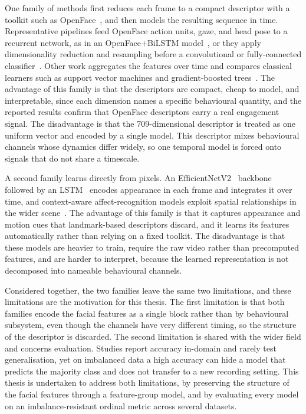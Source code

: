 \documentclass[../main.tex]{subfiles}
\begin{document}
One family of methods first reduces each frame to a compact descriptor with a toolkit such as OpenFace~\cite{openface2}, and then models the resulting sequence in time. Representative pipelines feed OpenFace action units, gaze, and head pose to a recurrent network, as in an OpenFace$+$BiLSTM model~\cite{openface_bilstm}, or they apply dimensionality reduction and resampling before a convolutional or fully-connected classifier~\cite{openface_pca_smote}. Other work aggregates the features over time and compares classical learners such as support vector machines and gradient-boosted trees~\cite{classical_ml_engagement}. The advantage of this family is that the descriptors are compact, cheap to model, and interpretable, since each dimension names a specific behavioural quantity, and the reported results confirm that OpenFace descriptors carry a real engagement signal. The disadvantage is that the 709-dimensional descriptor is treated as one uniform vector and encoded by a single model. This descriptor mixes behavioural channels whose dynamics differ widely, so one temporal model is forced onto signals that do not share a timescale.

A second family learns directly from pixels. An EfficientNetV2~\cite{efficientnetv2} backbone followed by an LSTM~\cite{efficientnet_lstm_engagement} encodes appearance in each frame and integrates it over time, and context-aware affect-recognition models exploit spatial relationships in the wider scene~\cite{context_aware_emotion_3d}. The advantage of this family is that it captures appearance and motion cues that landmark-based descriptors discard, and it learns its features automatically rather than relying on a fixed toolkit. The disadvantage is that these models are heavier to train, require the raw video rather than precomputed features, and are harder to interpret, because the learned representation is not decomposed into nameable behavioural channels.

Considered together, the two families leave the same two limitations, and these limitations are the motivation for this thesis. The first limitation is that both families encode the facial features as a single block rather than by behavioural subsystem, even though the channels have very different timing, so the structure of the descriptor is discarded. The second limitation is shared with the wider field and concerns evaluation. Studies report accuracy in-domain and rarely test generalisation, yet on imbalanced data a high accuracy can hide a model that predicts the majority class and does not transfer to a new recording setting. This thesis is undertaken to address both limitations, by preserving the structure of the facial features through a feature-group model, and by evaluating every model on an imbalance-resistant ordinal metric across several datasets.
\end{document}
